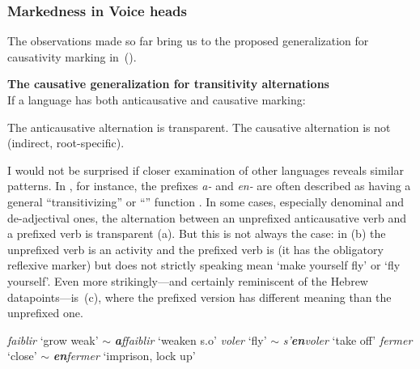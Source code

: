 \begin{exe}
\begin{xlist}
\begin{xlist}
\begin{exe}
\begin{exe}
\begin{xlist}
\begin{exe}
\begin{xlist}
\begin{exe}
\begin{xlist}
\begin{xlist}
\begin{exe}
\begin{xlist}
\begin{exe}
\begin{xlist}
\begin{exe}
\begin{exe}
\begin{exe}
\begin{xlist}
\begin{exe}
\begin{exe}
\begin{xlist}
\begin{xlist}
\begin{exe}
\begin{xlist}
\begin{exe}
\begin{exe}
\begin{exe}
\begin{xlist}
\begin{exe}
\begin{exe}
\begin{xlist}
\begin{exe}
\begin{xlist}
\begin{exe}
\begin{xlist}
\begin{exe}
\begin{xlist}
\begin{exe}
\begin{exe}
\begin{xlist}
\begin{exe}
\begin{exe}
\begin{xlist}
\begin{xlist}
\begin{exe}
\begin{xlist}
\begin{xlist}
\begin{exe}
\begin{xlist}
\begin{exe}
\begin{xlist}
			\subsubsection{Markedness in Voice heads} \label{vd:caus:markvoice}
The observations made so far bring us to the proposed generalization for causativity marking in~(\nextx).
 \begin{exe}
 \ex \label{ex:vd:causgen}\textbf{The causative generalization for transitivity alternations} \\
 	If a language has both anticausative and causative marking:
 \begin{xlist} 
 	\ex  The anticausative alternation is transparent. 
 	\ex  The causative alternation is not (indirect, root-specific). 
 \z
\z 

I would not be surprised if closer examination of other languages reveals similar patterns. In , for instance, the prefixes \emph{a-} and \emph{en-} are often described as having a general ``transitivizing'' or ``'' function \citep{junker87}. In some cases, especially denominal and de-adjectival ones, the  alternation between an unprefixed anticausative verb and a prefixed  verb is transparent (\nextx a). But this is not always the case: in (\nextx b) the unprefixed verb is an activity and the prefixed verb is  (it has the obligatory reflexive marker) but does not strictly speaking mean `make yourself fly' or `fly yourself'. Even more strikingly---and certainly reminiscent of the Hebrew datapoints---is~(\nextx c), where the prefixed version has different meaning than the unprefixed one.
 \begin{exe}
\ex  {}
	\begin{xlist}
	\ex \emph{faiblir}	`grow weak' $\sim$ 	\emph{\textbf{a}ffaiblir} `weaken s.o'
	\ex \emph{voler} `fly' $\sim$ \emph{s'\textbf{en}voler} `take off'
	\ex \emph{fermer}	`close' $\sim$ \emph{\textbf{en}fermer} `imprison, lock up'
\z
 \z 

\end{xlist}
\end{exe}
\end{xlist}
\end{exe}
\end{xlist}
\end{exe}
\end{xlist}
\end{exe}
\end{xlist}
\end{xlist}
\end{exe}
\end{xlist}
\end{xlist}
\end{exe}
\end{exe}
\end{xlist}
\end{exe}
\end{exe}
\end{xlist}
\end{exe}
\end{xlist}
\end{exe}
\end{xlist}
\end{exe}
\end{xlist}
\end{exe}
\end{exe}
\end{xlist}
\end{exe}
\end{exe}
\end{exe}
\end{xlist}
\end{exe}
\end{xlist}
\end{xlist}
\end{exe}
\end{exe}
\end{xlist}
\end{exe}
\end{exe}
\end{exe}
\end{xlist}
\end{exe}
\end{xlist}
\end{exe}
\end{xlist}
\end{xlist}
\end{exe}
\end{xlist}
\end{exe}
\end{xlist}
\end{exe}
\end{exe}
\end{xlist}
\end{xlist}
\end{exe}
